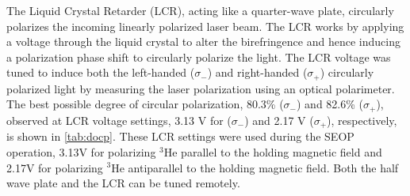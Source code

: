 The Liquid Crystal Retarder (LCR), acting like a quarter-wave plate, circularly polarizes the incoming linearly polarized laser beam. The LCR works by applying a voltage through the liquid crystal to alter the birefringence and hence inducing a polarization phase shift to circularly polarize the light. The LCR voltage was tuned to induce both the left-handed ($\sigma_-$) and right-handed ($\sigma_+$) circularly polarized light by measuring the laser polarization using an optical polarimeter. The best possible degree of circular polarization, 80.3\% ($\sigma_-$) and 82.6\% ($\sigma_+$), observed at LCR voltage settings, 3.13 V for ($\sigma_-$) and 2.17 V ($\sigma_+$), respectively, is shown in \cref{tab:docp}. These LCR settings were used during the SEOP operation, 3.13V for polarizing $^3$He parallel to the holding magnetic field and 2.17V for polarizing $^3$He antiparallel to the holding magnetic field. Both the half wave plate and the LCR can be tuned remotely.



